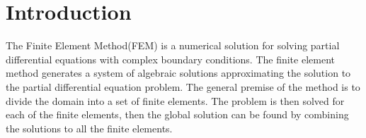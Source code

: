 \documentclass[fem.tex]{subfiles}
\begin{document}
\section{Introduction}%
\label{sec:introduction}

The Finite Element Method(FEM) is a numerical solution for solving partial
differential equations with complex boundary conditions. The finite element
method generates a system of algebraic solutions approximating the solution to
the partial differential equation problem. The general premise of the method is
to divide the domain into a set of finite elements. The problem is then solved
for each of the finite elements, then the global solution can be found by
combining the solutions to all the finite elements.
\end{document}
